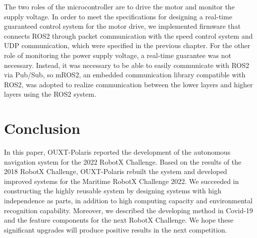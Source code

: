 \documentclass[lettersize,journal]{IEEEtran}
\begin{document}
The two roles of the microcontroller are to drive the motor and monitor the supply voltage.
In order to meet the specifications for designing a real-time guaranteed control system for the motor drive,
we implemented firmware that connects ROS2 through packet communication with the speed control system and UDP communication,
which were specified in the previous chapter.
For the other role of monitoring the power supply voltage, a real-time guarantee was not necessary.
Instead, it was necessary to be able to easily communicate with ROS2 via Pub/Sub, so mROS2, an embedded communication library compatible with ROS2, 
was adopted to realize communication between the lower layers and higher layers using the ROS2 system.

\section{Conclusion}
In this paper, OUXT-Polaris reported the development of the autonomous navigation system for the 2022 RobotX Challenge.
Based on the results of the 2018 RobotX Challenge, OUXT-Polaris rebuilt the system and
developed improved systems for the Maritime RobotX Challenge 2022.
We succeeded in constructing the highly reusable system by designing systems with high independence as parts,
in addition to high computing capacity and environmental recognition capability.
Moreover, we described the developing method in Covid-19 and the feature components for the next RobotX Challenge.
We hope these significant upgrades will produce positive results in the next competition.
\end{document}
